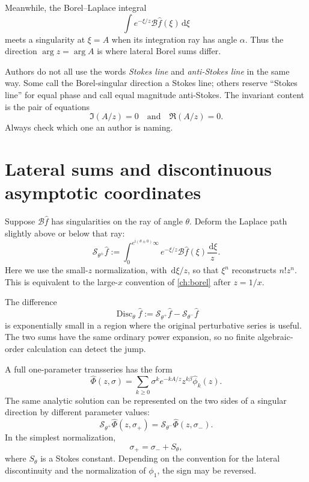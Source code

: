 \documentclass[11pt,openany]{book}
\theoremstyle{definition}
\theoremstyle{plain}
\theoremstyle{remark}
\newcommand{\dd}{\,\mathrm{d}}
\newcommand{\ii}{\mathrm{i}}
\newcommand{\trans}[1]{\widehat{#1}}
\newcommand{\Borel}{\mathcal{B}}
\newcommand{\lateralsum}[1]{\mathcal{S}_{#1}}
\begin{document}
Meanwhile, the Borel--Laplace integral
\[
 \int e^{-\xi/z}\Borel\trans f(\xi)\dd\xi
\]
meets a singularity at $\xi=A$ when its integration ray has angle $\alpha$. Thus the direction $\arg z=\arg A$ is where lateral Borel sums differ.

\begin{warningbox}
Authors do not all use the words \emph{Stokes line} and \emph{anti-Stokes line} in the same way. Some call the Borel-singular direction a Stokes line; others reserve ``Stokes line'' for equal phase and call equal magnitude anti-Stokes. The invariant content is the pair of equations
\[
 \Im(A/z)=0
 \quad\text{and}\quad
 \Re(A/z)=0.
\]
Always check which one an author is naming.
\end{warningbox}

\section{Lateral sums and discontinuous asymptotic coordinates}

Suppose $\Borel\trans f$ has singularities on the ray of angle $\theta$. Deform the Laplace path slightly above or below that ray:
\begin{equation}\label{eq:lateral-general}
 \lateralsum{\theta^\pm}\trans f
 :=\int_0^{e^{\ii(\theta\pm0)}\infty}
 e^{-\xi/z}\Borel\trans f(\xi)\frac{\dd\xi}{z}.
\end{equation}
Here we use the small-$z$ normalization, with $\dd\xi/z$, so that $\xi^n$ reconstructs $n!z^n$. This is equivalent to the large-$x$ convention of \cref{ch:borel} after $z=1/x$.

The difference
\begin{equation}\label{eq:disc-definition}
 \operatorname{Disc}_\theta\trans f
 :=\lateralsum{\theta^+}\trans f-
   \lateralsum{\theta^-}\trans f
\end{equation}
is exponentially small in a region where the original perturbative series is useful. The two sums have the same ordinary power expansion, so no finite algebraic-order calculation can detect the jump.

A full one-parameter transseries has the form
\begin{equation}\label{eq:stokes-full-transseries}
 \trans\Phi(z,\sigma)
 =\sum_{k\ge0}\sigma^k e^{-kA/z}
 z^{k\beta}\trans\phi_k(z).
\end{equation}
The same analytic solution can be represented on the two sides of a singular direction by different parameter values:
\begin{equation}\label{eq:stokes-parameter-match}
 \lateralsum{\theta^+}\trans\Phi(z,\sigma_+)
 =\lateralsum{\theta^-}\trans\Phi(z,\sigma_-).
\end{equation}
In the simplest normalization,
\begin{equation}\label{eq:simple-stokes-shift}
 \sigma_+=\sigma_-+S_\theta,
\end{equation}
where $S_\theta$ is a Stokes constant. Depending on the convention for the lateral discontinuity and the normalization of $\phi_1$, the sign may be reversed.
\end{document}
